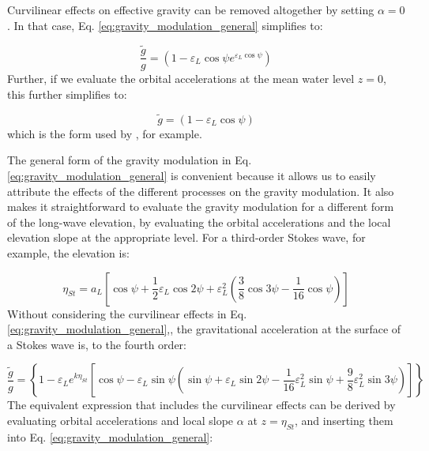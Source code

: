 \documentclass[lineno]{jfm}
\begin{document}
Curvilinear effects on effective gravity can be removed altogether by setting
$\alpha = 0$.
In that case, Eq. \ref{eq:gravity_modulation_general} simplifies to:

\begin{equation}
\label{eq:gravity_modulation_linear_no_curvature}
\frac{\widetilde{g}}{g} = \left( 1 - \varepsilon_L \cos{\psi} e^{\varepsilon_L \cos{\psi}} \right)
\end{equation}
Further, if we evaluate the orbital accelerations at the mean water level $z=0$,
this further simplifies to:

\begin{equation}
\label{eq:gravity_modulation_linear_no_curvature_mean_level}
\widetilde{g} = \left( 1 - \varepsilon_L \cos{\psi} \right)
\end{equation}
which is the form used by \citet{peureux2021unsteady}, for example.

The general form of the gravity modulation in Eq. \ref{eq:gravity_modulation_general}
is convenient because it allows us to easily attribute the effects of the different
processes on the gravity modulation.
It also makes it straightforward to evaluate the gravity modulation for a different
form of the long-wave elevation, by evaluating the orbital accelerations and the
local elevation slope at the appropriate level.
For a third-order Stokes wave, for example, the elevation is:

\begin{equation}
\label{eq:eta_stokes}
\eta_{St} = a_L \left[
  \cos{\psi} +
  \dfrac{1}{2} \varepsilon_L \cos{2\psi} +
  \varepsilon_L^2 \left( \dfrac{3}{8} \cos{3\psi} - \dfrac{1}{16} \cos{\psi} \right)
\right]
\end{equation}
Without considering the curvilinear effects in Eq. \ref{eq:gravity_modulation_general},,
the gravitational acceleration at the surface of a Stokes wave is, to the
fourth order:

\begin{equation}
\label{eq:gravity_modulation_stokes}
\frac{\widetilde{g}}{g} =
\left\{
  1 - \varepsilon_L e^{k \eta_{St}}
  \left[ \cos{\psi} -
    \varepsilon_L \sin{\psi} \left(
      \sin{\psi}
      + \varepsilon_L \sin{2\psi}
      - \dfrac{1}{16} \varepsilon_L^2 \sin{\psi}
      + \dfrac{9}{8} \varepsilon_L^2 \sin{3\psi}
    \right)
  \right]
\right\}
\end{equation}
The equivalent expression that includes the curvilinear effects can be derived
by evaluating orbital accelerations and local slope $\alpha$ at $z = \eta_{St}$,
and inserting them into Eq. \ref{eq:gravity_modulation_general}:
\end{document}
